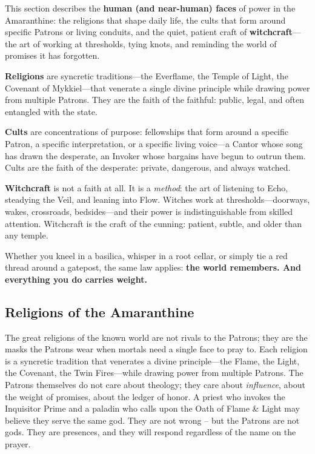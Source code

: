 This section describes the \textbf{human (and near-human) faces} of power in the Amaranthine: the religions that shape daily life, the cults that form around specific Patrons or living conduits, and the quiet, patient craft of \textbf{witchcraft}---the art of working at thresholds, tying knots, and reminding the world of promises it has forgotten.

\textbf{Religions} are syncretic traditions---the Everflame, the Temple of Light, the Covenant of Mykkiel---that venerate a single divine principle while drawing power from multiple Patrons. They are the faith of the faithful: public, legal, and often entangled with the state.

\textbf{Cults} are concentrations of purpose: fellowships that form around a specific Patron, a specific interpretation, or a specific living voice---a Cantor whose song has drawn the desperate, an Invoker whose bargains have begun to outrun them. Cults are the faith of the desperate: private, dangerous, and always watched.

\textbf{Witchcraft} is not a faith at all. It is a \textit{method}: the art of listening to Echo, steadying the Veil, and leaning into Flow. Witches work at thresholds---doorways, wakes, crossroads, bedsides---and their power is indistinguishable from skilled attention. Witchcraft is the craft of the cunning: patient, subtle, and older than any temple.

Whether you kneel in a basilica, whisper in a root cellar, or simply tie a red thread around a gatepost, the same law applies: \textbf{the world remembers. And everything you do carries weight.}

\subsection{Religions of the Amaranthine}
\label{sec:religions}

The great religions of the known world are not rivals to the Patrons; they are the masks the Patrons wear when mortals need a single face to pray to. Each religion is a syncretic tradition that venerates a divine principle---the Flame, the Light, the Covenant, the Twin Fires---while drawing power from multiple Patrons. The Patrons themselves do not care about theology; they care about \textit{influence}, about the weight of promises, about the ledger of honor. A priest who invokes the Inquisitor Prime and a paladin who calls upon the Oath of Flame \& Light may believe they serve the same god. They are not wrong -- but the Patrons are not gods. They are presences, and they will respond regardless of the name on the prayer.

